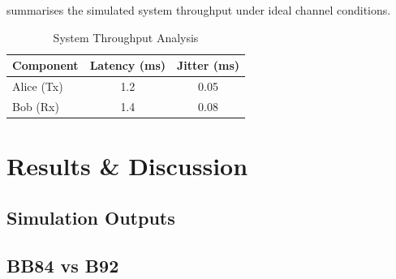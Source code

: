 \documentclass[10pt, a4paper]{report}
\renewcommand{\footnotesize}{\fontsize{8}{9}\selectfont}
\begin{document}
 summarises the simulated system throughput under
ideal channel conditions.

\begin{table}[H]
    \centering
    \caption{System Throughput Analysis}\label{tab:throughput}
    {\footnotesize                     %
    \begin{tabular}{l c c}
        \toprule
        \textbf{Component} & \textbf{Latency (ms)} & \textbf{Jitter (ms)} \\
        \midrule
        Alice (Tx)         & 1.2                   & 0.05                 \\
        Bob (Rx)           & 1.4                   & 0.08                 \\
        \bottomrule
    \end{tabular}}
\end{table}



\chapter{Results \& Discussion}


\section{Simulation Outputs}

\section{BB84 vs B92}
\end{document}
